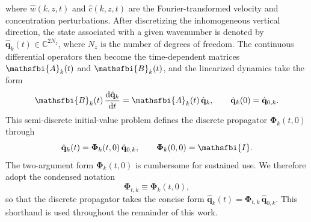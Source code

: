 where \(\hat{w}(k,z,t)\) and \(\hat{c}(k,z,t)\) are the Fourier-transformed velocity and
concentration perturbations. After discretizing the inhomogeneous vertical direction, the state associated with a given wavenumber is denoted by \(\hat{\mathbf{q}}_{k}(t)\in\mathbb{C}^{2N_z}\), where \(N_z\) is the number of degrees of freedom. The continuous differential operators then become the time-dependent matrices \(\mathsfbi{A}_{k}(t)\) and \(\mathsfbi{B}_{k}(t)\), and the linearized dynamics take the form
\begin{equation}
    \label{eq:semidiscrete_system}
    \mathsfbi{B}_{k}(t)\,\difft{\hat{\mathbf{q}}_{k}}{t}
    =
    \mathsfbi{A}_{k}(t)\,\hat{\mathbf{q}}_{k},
    \qquad
    \hat{\mathbf{q}}_{k}(0)=\hat{\mathbf{q}}_{0,k}.
\end{equation}
This semi-discrete initial-value problem defines the discrete propagator
\(\boldsymbol{\Phi}_{k}(t,0)\) through
\begin{equation}
    \label{eq:discrete_propagator}
    \hat{\mathbf{q}}_{k}(t)
    =
    \boldsymbol{\Phi}_{k}(t,0)\,\hat{\mathbf{q}}_{0,k},
    \qquad
    \boldsymbol{\Phi}_{k}(0,0)=\mathsfbi{I}.
\end{equation}
The two-argument form \(\boldsymbol{\Phi}_{k}(t,0)\) is cumbersome for sustained use. We therefore adopt the condensed notation
\begin{equation}
    \label{eq:propagator_shorthand}
    \boldsymbol{\Phi}_{t,k} \equiv \boldsymbol{\Phi}_{k}(t,0),
\end{equation}
so that the discrete propagator takes the concise form \(\hat{\mathbf{q}}_{k}(t)=\boldsymbol{\Phi}_{t,k}\,\hat{\mathbf{q}}_{0,k}\). This shorthand is used throughout the remainder of this work.


